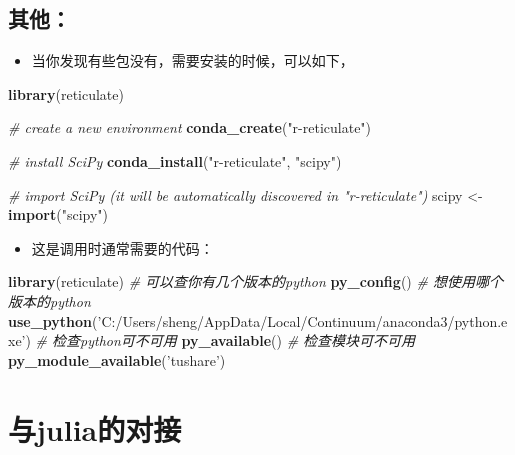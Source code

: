 \documentclass[
]{book}
\newenvironment{Shaded}{\begin{snugshade}}{\end{snugshade}}
\newcommand{\CommentTok}[1]{\textcolor[rgb]{0.56,0.35,0.01}{\textit{#1}}}
\newcommand{\KeywordTok}[1]{\textcolor[rgb]{0.13,0.29,0.53}{\textbf{#1}}}
\newcommand{\NormalTok}[1]{#1}
\newcommand{\StringTok}[1]{\textcolor[rgb]{0.31,0.60,0.02}{#1}}
\providecommand{\tightlist}{%
  \setlength{\itemsep}{0pt}\setlength{\parskip}{0pt}}
\begin{document}
\hypertarget{ux5176ux4ed6}{%
\subsection{其他：}\label{ux5176ux4ed6}}

\begin{itemize}
\tightlist
\item
  当你发现有些包没有，需要安装的时候，可以如下，
\end{itemize}

\begin{Shaded}
\begin{Highlighting}[]
\KeywordTok{library}\NormalTok{(reticulate)}

\CommentTok{# create a new environment }
\KeywordTok{conda_create}\NormalTok{(}\StringTok{"r-reticulate"}\NormalTok{)}

\CommentTok{# install SciPy}
\KeywordTok{conda_install}\NormalTok{(}\StringTok{"r-reticulate"}\NormalTok{, }\StringTok{"scipy"}\NormalTok{)}

\CommentTok{# import SciPy (it will be automatically discovered in "r-reticulate")}
\NormalTok{scipy <-}\StringTok{ }\KeywordTok{import}\NormalTok{(}\StringTok{"scipy"}\NormalTok{)}
\end{Highlighting}
\end{Shaded}

\begin{itemize}
\tightlist
\item
  这是调用时通常需要的代码：
\end{itemize}

\begin{Shaded}
\begin{Highlighting}[]
\KeywordTok{library}\NormalTok{(reticulate)}
\CommentTok{# 可以查你有几个版本的python}
\KeywordTok{py_config}\NormalTok{()}
\CommentTok{# 想使用哪个版本的python}
\KeywordTok{use_python}\NormalTok{(}\StringTok{'C:/Users/sheng/AppData/Local/Continuum/anaconda3/python.exe'}\NormalTok{)}
\CommentTok{# 检查python可不可用}
\KeywordTok{py_available}\NormalTok{()}
\CommentTok{# 检查模块可不可用}
\KeywordTok{py_module_available}\NormalTok{(}\StringTok{'tushare'}\NormalTok{)}
\end{Highlighting}
\end{Shaded}

\hypertarget{ux4e0ejuliaux7684ux5bf9ux63a5}{%
\section{与julia的对接}\label{ux4e0ejuliaux7684ux5bf9ux63a5}}
\end{document}
